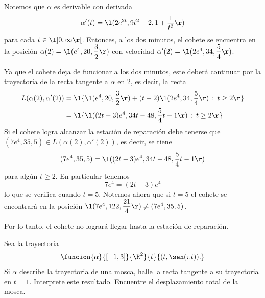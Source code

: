 \documentclass[a4,11pt]{aleph-examen}
\begin{document}
\begin{preguntas}
\begin{respuesta}
Notemos que $\alpha$ es derivable con derivada
\[
\alpha'(t) = \l(2e^{2t},9t^2-2,1+\dfrac{1}{t^2}\r)
\]
para cada $t\in \l] 0,\infty \r[ $. Entonces, a los dos minutos, el cohete se encuentra en la posición $\alpha(2)=\l(e^4,20,\dfrac{3}{2}\r)$ con velocidad $\alpha'(2)=\l(2e^4,34,\dfrac{5}{4}\r)$. 

Ya que el cohete deja de funcionar a los dos minutos, este deberá continuar por la trayectoria de la recta tangente a $\alpha$ en 2, es decir, la recta
\begin{align*}
    L(\alpha(2),\alpha'(2)) &= \l\{\l(e^4,20,\dfrac{3}{2}\r) + (t-2)\l(2e^4,34,\dfrac{5}{4}\r)\,:\,t \geq 2\r\}\\
    &= \l\{\l((2t-3)e^4, 34t-48,\dfrac{5}{4}t-1\r)\,:\,t \geq 2\r\}\\
\end{align*}
Si el cohete logra alcanzar la estación de reparación debe tenerse que $(7e^4,35,5)\in L(\alpha(2),\alpha'(2))$, es decir, se tiene
\[
(7e^4,35,5) = \l((2t-3)e^4, 34t-48,\dfrac{5}{4}t-1\r)
\]
para algún $t \geq 2$. En particular tenemos
\[
7e^4 = (2t-3)e^4
\]
lo que se verifica cuando $t=5$. Notemos ahora que si $t=5$ el cohete se encontrará en la posición $\l(7e^4,122,\dfrac{21}{4}\r)\neq(7e^4,35,5)$.

Por lo tanto, el cohete no logrará llegar hasta la estación de reparación.
\end{respuesta}


\item 
    Sea la trayectoria 
    \[
        \funcion{\alpha}{[-1,3]}{\R^2}{t}{(t,\sen(\pi t)).}
    \]
    Si $\alpha$ describe la trayectoria de una mosca, halle la recta tangente a su trayectoria en $t=1$. Interprete este resultado. Encuentre el desplazamiento total de la mosca.



\end{preguntas}
\end{document}
